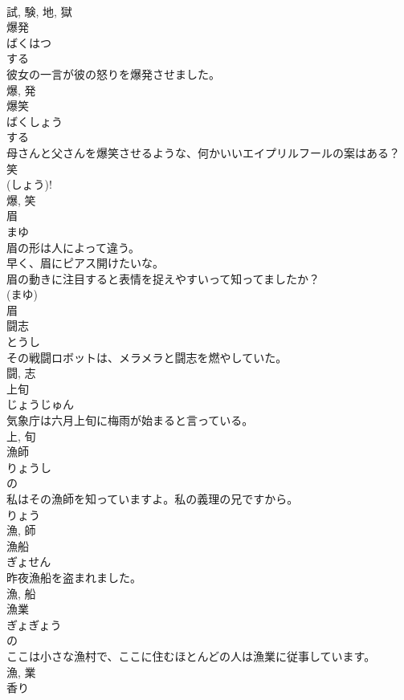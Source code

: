 \documentclass[8pt]{extreport}
\begin{document}
\begin{CJK}{UTF8}{min}
\\	試, 験, 地, 獄	
\\	爆発	
\\	ばくはつ	
\\	する 
\\	彼女の一言が彼の怒りを爆発させました。	
\\	爆, 発	
\\	爆笑	
\\	ばくしょう	
\\	する 
\\	母さんと父さんを爆笑させるような、何かいいエイプリルフールの案はある？	
\\	笑 
\\	(しょう)! 
\\	爆, 笑	
\\	眉	
\\	まゆ	
\\	眉の形は人によって違う。	
\\	早く、眉にピアス開けたいな。	
\\	眉の動きに注目すると表情を捉えやすいって知ってましたか？	
\\	(まゆ)
\\	眉	
\\	闘志	
\\	とうし	
\\	その戦闘ロボットは、メラメラと闘志を燃やしていた。	
\\	闘, 志	
\\	上旬	
\\	じょうじゅん	
\\	気象庁は六月上旬に梅雨が始まると言っている。	
\\	上, 旬	
\\	漁師	
\\	りょうし	
\\	の 
\\	私はその漁師を知っていますよ。私の義理の兄ですから。	
\\	りょう 
\\	漁, 師	
\\	漁船	
\\	ぎょせん	
\\	昨夜漁船を盗まれました。	
\\	漁, 船	
\\	漁業	
\\	ぎょぎょう	
\\	の 
\\	ここは小さな漁村で、ここに住むほとんどの人は漁業に従事しています。	
\\	漁, 業	
\\	香り	

\end{CJK}
\end{document}
